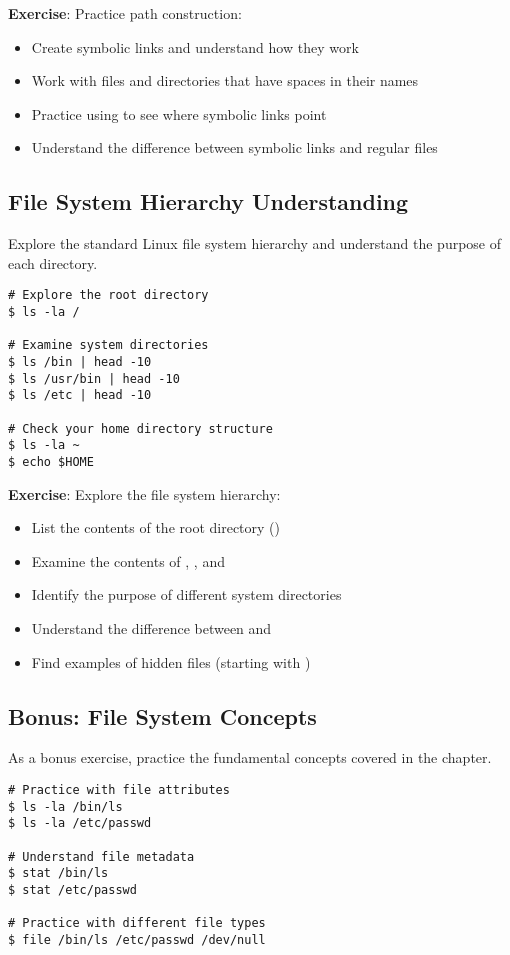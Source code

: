 \textbf{Exercise}: Practice path construction:
\begin{itemize}
    \item Create symbolic links and understand how they work
    \item Work with files and directories that have spaces in their names
    \item Practice using  to see where symbolic links point
    \item Understand the difference between symbolic links and regular files
\end{itemize}

\subsection{File System Hierarchy Understanding}

Explore the standard Linux file system hierarchy and understand the purpose of each directory.

\begin{lstlisting}[style=bashstyle]
# Explore the root directory
$ ls -la /

# Examine system directories
$ ls /bin | head -10
$ ls /usr/bin | head -10
$ ls /etc | head -10

# Check your home directory structure
$ ls -la ~
$ echo $HOME
\end{lstlisting}

\textbf{Exercise}: Explore the file system hierarchy:
\begin{itemize}
    \item List the contents of the root directory (\file{/})
    \item Examine the contents of , , and 
    \item Identify the purpose of different system directories
    \item Understand the difference between  and 
    \item Find examples of hidden files (starting with )
\end{itemize}

\subsection{Bonus: File System Concepts}

As a bonus exercise, practice the fundamental concepts covered in the chapter.

\begin{lstlisting}[style=bashstyle]
# Practice with file attributes
$ ls -la /bin/ls
$ ls -la /etc/passwd

# Understand file metadata
$ stat /bin/ls
$ stat /etc/passwd

# Practice with different file types
$ file /bin/ls /etc/passwd /dev/null
\end{lstlisting}

